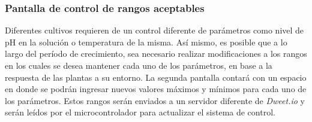 \subsubsection{Pantalla de control de rangos aceptables}
Diferentes cultivos requieren de un control diferente de parámetros como nivel de pH en la solución o temperatura de la misma. Así mismo, es posible que a lo largo del período de crecimiento, sea necesario realizar modificaciones a los rangos en los cuales se desea mantener cada uno de los parámetros, en base a la respuesta de las plantas a su entorno. La segunda pantalla contará con un espacio en donde se podrán ingresar nuevos valores máximos y mínimos para cada uno de los parámetros. Estos rangos serán enviados a un servidor diferente de \textit{Dweet.io} y serán leídos por el microcontrolador para actualizar el sistema de control.


